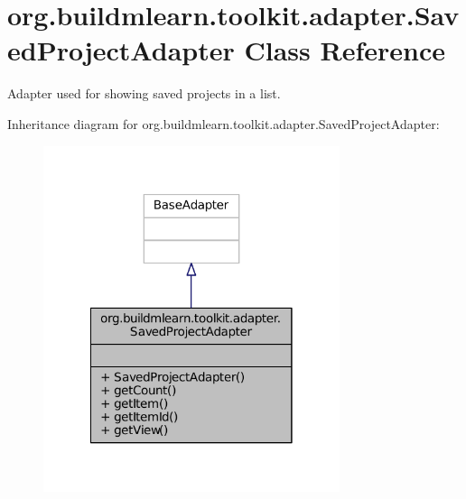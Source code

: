 \hypertarget{classorg_1_1buildmlearn_1_1toolkit_1_1adapter_1_1SavedProjectAdapter}{\section{org.\-buildmlearn.\-toolkit.\-adapter.\-Saved\-Project\-Adapter Class Reference}
\label{classorg_1_1buildmlearn_1_1toolkit_1_1adapter_1_1SavedProjectAdapter}
}


Adapter used for showing saved projects in a list.  




Inheritance diagram for org.\-buildmlearn.\-toolkit.\-adapter.\-Saved\-Project\-Adapter\-:
\nopagebreak
\begin{figure}[H]
\begin{center}
\leavevmode
\includegraphics[width=246pt]{d3/d85/classorg_1_1buildmlearn_1_1toolkit_1_1adapter_1_1SavedProjectAdapter__inherit__graph}
\end{center}
\end{figure}


